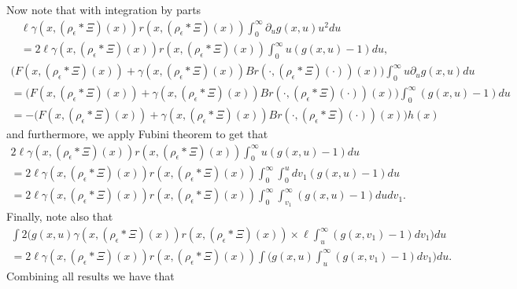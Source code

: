 \documentclass[12pt]{article}
\begin{document}
\normalsize
Now note that with integration by parts
\begin{multline}
 \ell \gamma(x, (\rho_{\epsilon}*\Xi)(x)) r(x, (\rho_{\epsilon}*\Xi)(x))  \int_{0}^{\infty}\partial_u g(x,u) u^2 du  \\=  2\ell\gamma(x, (\rho_{\epsilon}*\Xi)(x)) r(x, (\rho_{\epsilon}*\Xi)(x))\int_{0}^{\infty} u (g(x,u)-1) du, 
\end{multline}
\begin{multline}
 \big(F(x, (\rho_{\epsilon}*\Xi)(x))+\gamma(x, (\rho_{\epsilon}*\Xi)(x))Br( \cdot, (\rho_{\epsilon}* \Xi)(\cdot))(x)\big)\int_{0}^{\infty} u \partial_u g(x,u)du \\=\big(F(x, (\rho_{\epsilon}*\Xi)(x))+\gamma(x, (\rho_{\epsilon}*\Xi)(x))Br( \cdot, (\rho_{\epsilon}* \Xi)(\cdot))(x)\big)\int_{0}^{\infty} (g(x,u)-1) du\\
 =-\big(F(x, (\rho_{\epsilon}*\Xi)(x))+\gamma(x, (\rho_{\epsilon}*\Xi)(x))Br( \cdot, (\rho_{\epsilon}* \Xi)(\cdot))(x)\big) h(x)
\end{multline}
and furthermore, we apply Fubini theorem to get that 
\begin{multline}
  2 \ell \gamma(x, (\rho_{\epsilon}*\Xi)(x)) r(x, (\rho_{\epsilon}*\Xi)(x)) \int_{0}^{\infty} u    (g(x,u)-1) du \\
  =   2 \ell \gamma(x, (\rho_{\epsilon}*\Xi)(x)) r(x, (\rho_{\epsilon}*\Xi)(x)) \int_{0}^{\infty} \int_{0}^{u}    dv_1 (g(x,u)-1) du \\
  =  2 \ell \gamma(x, (\rho_{\epsilon}*\Xi)(x)) r(x, (\rho_{\epsilon}*\Xi)(x)) \int_{0}^{\infty}  \int_{v_1}^{\infty}    (g(x,u)-1) du dv_1.
\end{multline}
Finally, note also that
\begin{multline}
\int 2\bigg(g(x,u)\gamma(x, (\rho_{\epsilon}*\Xi)(x)) r(x, (\rho_{\epsilon}*\Xi)(x))\times \ell \int_u^{
\infty}(g(x,v_1)-1)dv_1\bigg)du\\
= 2\ell \gamma(x, (\rho_{\epsilon}*\Xi)(x)) r(x, (\rho_{\epsilon}*\Xi)(x))\int \bigg( g(x,u) \int_u^{
\infty}(g(x,v_1)-1)dv_1\bigg)du.
\end{multline}
\normalsize
Combining all results we have that
\small
\end{document}
